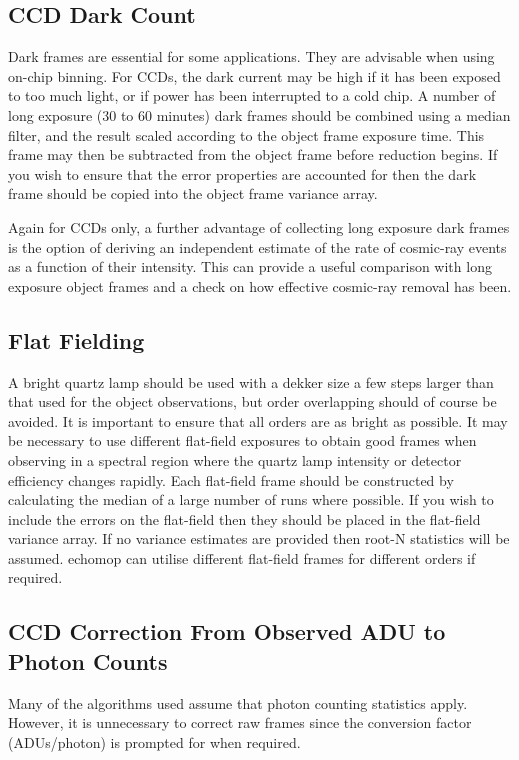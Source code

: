 \documentclass[11pt,twoside]{article}
\newcommand{\xlabel}[1]{}
\newcommand{\mlabel}[1]{\xlabel{#1}\label{#1}}
\newcommand{\myindex}[1]{\index{#1}}
\renewcommand{\myindex}[1]{}
\begin{document}
\subsection{\mlabel{CCD_dark_count}CCD Dark Count}
\myindex{CCD!dark count}
Dark frames are essential for some applications. They are advisable when
using on-chip binning. For CCDs, the dark current may be high if it has
been exposed to too much light, or if power has been interrupted to a cold
chip. A number of long exposure (30 to 60 minutes) dark frames should be
combined using a median filter, and the result scaled according to the
object frame exposure time. This frame may then be subtracted from the
object frame before reduction begins. If you wish to ensure that the
error properties are accounted for then the dark frame should be copied
into the object frame variance array.

Again for CCDs only, a further advantage of collecting long exposure
dark frames is the option of deriving an independent estimate of the
rate of cosmic-ray events as a function of their intensity.  This can
provide a useful comparison with long exposure object frames and a check
on how effective cosmic-ray removal has been.

\subsection{\mlabel{flat_fielding}Flat Fielding}
\myindex{Flat field}
\myindex{Continuum lamp}
\myindex{Dekker}

A bright quartz lamp should be used with a dekker size a few steps
larger than that used for the object observations, but order overlapping
should of course be avoided. It is important to ensure that all orders
are as bright as possible. It may be necessary to use different
flat-field exposures to obtain good frames when observing in a spectral
region where the quartz lamp intensity or detector efficiency changes
rapidly. Each flat-field frame should be constructed by calculating the
median of a large number of runs where possible. If you wish to include
the errors on the flat-field then they should be placed in the flat-field
variance array.  If no variance estimates are provided then
root-N statistics will be assumed.\myindex{Variance}
{\sc echomop} can utilise different flat-field frames for different orders if
required.

\subsection{\mlabel{CCD_adu_to_photon}CCD Correction From Observed
            ADU to Photon Counts}
\myindex{ADUs}
\myindex{Photon counting statistics}
Many of the algorithms used assume that photon counting statistics
apply. However, it is unnecessary to correct raw frames since the
conversion factor (ADUs/photon) is prompted for when required.
\end{document}
